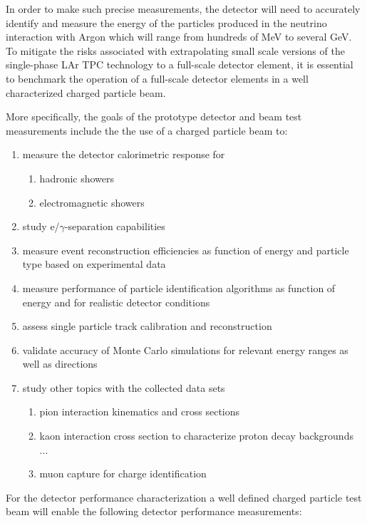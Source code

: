 In order to make such precise measurements, the detector will need to accurately identify and measure the energy of the particles produced in the neutrino interaction with Argon which will range from hundreds of MeV to several GeV.
To mitigate the risks associated with extrapolating small scale versions of the single-phase LAr TPC technology to a full-scale detector element, it is essential to benchmark the operation of a full-scale detector elements in a well characterized charged particle beam.  

More specifically, the goals of the prototype detector and beam test measurements include the
the use of a charged particle beam to:
\begin{enumerate}
\item measure the detector calorimetric response for
\begin{enumerate}
	\item hadronic showers
	\item electromagnetic showers
\end{enumerate}
\item study e/$\gamma$-separation capabilities
\item measure event reconstruction efficiencies as function of energy and particle type based on experimental data
\item measure performance of particle identification algorithms as function of energy and for realistic detector conditions
\item assess single particle track calibration and reconstruction
\item validate accuracy of Monte Carlo simulations for relevant energy ranges as well as directions

\item study other topics with the collected data sets
 \begin{enumerate}
    \item pion interaction kinematics and cross sections
    \item kaon interaction cross section to characterize proton decay backgrounds ...
    \item muon capture for charge identification
 \end{enumerate}
\end{enumerate}

For the detector performance characterization a well defined charged particle test beam will 
enable the following detector performance measurements:

